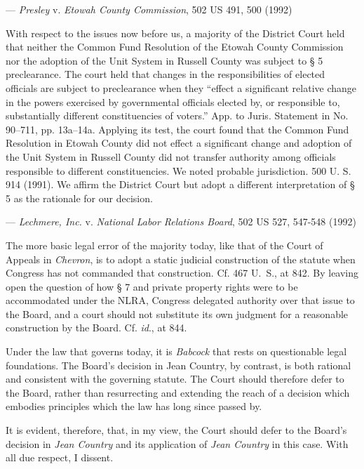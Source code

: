 \setupleglipsum
{ --- \textit{Presley} v. \textit{Etowah County Commission}, 502 US 491, 500 (1992)}
{
With respect to the issues now before us, a majority of the
District Court held that neither the Common Fund Resolution
of the Etowah County Commission nor the adoption of
the Unit System in Russell County was subject to § 5 preclearance.
The court held that changes in the responsibilities
of elected officials are subject to preclearance when they
“effect a significant relative change in the powers exercised
by governmental officials elected by, or responsible to, substantially
different constituencies of voters.” App. to Juris.
Statement in No. 90–711, pp. 13a–14a. Applying its test, the
court found that the Common Fund Resolution in Etowah
County did not effect a significant change and adoption of
the Unit System in Russell County did not transfer authority
among officials responsible to different constituencies. We
noted probable jurisdiction. 500 U. S. 914 (1991). We affirm
the District Court but adopt a different interpretation
of § 5 as the rationale for our decision.\par
}

\setupleglipsum
{ --- \textit{Lechmere, Inc.} v. \textit{National Labor Relations Board}, 502 US 527, 547-548 (1992)}
{
The more basic legal error of the majority today, like that
of the Court of Appeals in \textit{Chevron}, is to adopt a static judicial
construction of the statute when Congress has not commanded
that construction. Cf. 467 U.~S., at 842. By leaving
open the question of how § 7 and private property rights
were to be accommodated under the NLRA, Congress delegated
authority over that issue to the Board, and a court
should not substitute its own judgment for a reasonable construction
by the Board. Cf. \textit{id}., at 844.\par
Under the law that governs today, it is \textit{Babcock} that rests
on questionable legal foundations. The Board’s decision in
Jean Country, by contrast, is both rational and consistent
with the governing statute. The Court should therefore
defer to the Board, rather than resurrecting and extending
the reach of a decision which embodies principles which the
law has long since passed by.\par
It is evident, therefore, that, in my view, the Court should
defer to the Board’s decision in \textit{Jean Country} and its application
of \textit{Jean Country} in this case. With all due respect, I
dissent.\par
}








